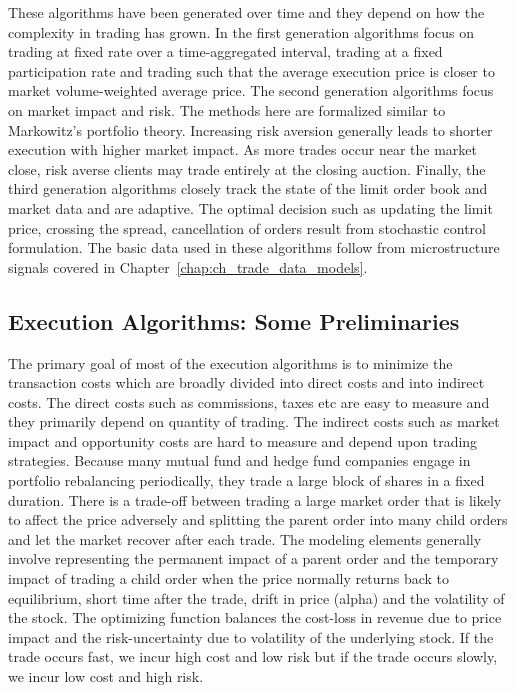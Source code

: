 These algorithms have been generated over time and they depend on how the complexity in trading has grown. In the first generation algorithms focus on trading at fixed rate over a time-aggregated interval, trading at a fixed participation rate and trading such that the average execution price is closer to market volume-weighted average price. The second generation algorithms focus on market impact and risk. The methods here are formalized similar to Markowitz's portfolio theory. Increasing risk aversion generally leads to shorter execution with higher market impact. As more trades occur near the market close, risk averse clients may trade entirely at the closing auction. Finally, the third generation algorithms closely track the state of the limit order book and market data and are adaptive. The optimal decision such as updating the limit price, crossing the spread, cancellation of orders result from stochastic control formulation. The basic data used in these algorithms follow from microstructure signals covered in Chapter~\ref{chap:ch_trade_data_models}. 



\subsection{Execution Algorithms: Some Preliminaries}


The primary goal of most of the execution algorithms is to minimize the transaction costs which are broadly divided into direct costs and into indirect costs. The direct costs such as commissions, taxes etc are easy to measure and they primarily depend on quantity of trading. The indirect costs such as market impact and opportunity costs are hard to measure and depend upon trading strategies. Because many mutual fund and hedge fund companies engage in portfolio rebalancing periodically, they trade a large block of shares in a fixed duration. There is a trade-off between trading a large market order that is likely to affect the price adversely and splitting the parent order into many child orders and let the market recover after each trade. The modeling elements generally involve representing the permanent impact of a parent order and the temporary impact of trading a child order when the price normally returns back to equilibrium, short time after the trade, drift in price (alpha) and the volatility of the stock. The optimizing function balances the cost-loss in revenue due to price impact and the risk-uncertainty due to volatility of the underlying stock. If the trade occurs fast, we incur high cost and low risk but if the trade occurs slowly, we incur low cost and high risk.


